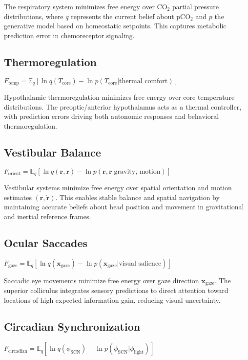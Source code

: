 \documentclass[10pt]{article}
\begin{document}
The respiratory system minimizes free energy over CO$_2$ partial pressure distributions, where $q$ represents the current belief about pCO$_2$ and $p$ the generative model based on homeostatic setpoints. This captures metabolic prediction error in chemoreceptor signaling.

\subsection{Thermoregulation}
$F_{\text{temp}} = \mathbb{E}_q[\ln q(T_{\text{core}}) - \ln p(T_{\text{core}}|\text{thermal comfort})]$

Hypothalamic thermoregulation minimizes free energy over core temperature distributions. The preoptic/anterior hypothalamus acts as a thermal controller, with prediction errors driving both autonomic responses and behavioral thermoregulation.

\subsection{Vestibular Balance}
$F_{\text{orient}} = \mathbb{E}_q[\ln q(\mathbf{r}, \dot{\mathbf{r}}) - \ln p(\mathbf{r}, \dot{\mathbf{r}}|\text{gravity, motion})]$

Vestibular systems minimize free energy over spatial orientation and motion estimates $(\mathbf{r}, \dot{\mathbf{r}})$. This enables stable balance and spatial navigation by maintaining accurate beliefs about head position and movement in gravitational and inertial reference frames.

\subsection{Ocular Saccades}
$F_{\text{gaze}} = \mathbb{E}_q[\ln q(\mathbf{x}_{\text{gaze}}) - \ln p(\mathbf{x}_{\text{gaze}}|\text{visual salience})]$

Saccadic eye movements minimize free energy over gaze direction $\mathbf{x}_{\text{gaze}}$. The superior colliculus integrates sensory predictions to direct attention toward locations of high expected information gain, reducing visual uncertainty.

\subsection{Circadian Synchronization}
$F_{\text{circadian}} = \mathbb{E}_q[\ln q(\phi_{\text{SCN}}) - \ln p(\phi_{\text{SCN}}|\phi_{\text{light}})]$
\end{document}
